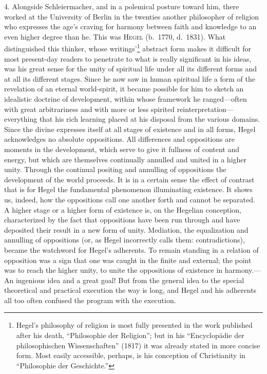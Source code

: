 \documentclass[12pt,a4paper]{book}
\newcommand{\opage}[1]{\marginnote{\footnotesize\textit{[#1]}}}
\begin{document}
4. Alongside Schleiermacher, and in a polemical posture
toward him, there worked at the University of Berlin in the twenties
another philosopher of religion who expresses the age's craving for
harmony between faith and knowledge to an even higher degree than he.
This was \textsc{Hegel} (b.\ 1770, d.\ 1831). What distinguished this
thinker, whose writings'\footnote{Hegel's philosophy of religion is
most fully presented in the work published after his death, ``Philosophie
der Religion''; but in his ``Encyclopädie der philosophischen
Wissenschaften'' (1817) it was already stated in more concise form. Most
easily accessible, perhaps, is his conception of Christianity in
``Philosophie der Geschichte.''} abstract form makes it difficult for most
present-day readers to penetrate to what is really significant in his
ideas, was his great sense for the
\opage{11}unity of spiritual life under all its different forms and at all its
different stages. Since he now saw in human spiritual life a form of the
revelation of an eternal world-spirit, it became possible for him to
sketch an idealistic doctrine of development, within whose framework he
ranged---often with great arbitrariness and with more or less spirited
reinterpretation---everything that his rich learning placed at his
disposal from the various domains. Since the divine expresses itself at
all stages of existence and in all forms, Hegel acknowledges no absolute
oppositions. All differences and oppositions are moments in the
development, which serve to give it fullness of content and energy, but
which are themselves continually annulled and united in a higher unity.
Through the continual positing and annulling of oppositions the
development of the world proceeds. It is in a certain sense the effect of
contrast that is for Hegel the fundamental phenomenon illuminating
existence. It shows us, indeed, how the oppositions call one another
forth and cannot be separated. A higher stage or a higher form of
existence is, on the Hegelian conception, characterized by the fact that
oppositions have been run through and have deposited their result in a
new form of unity. Mediation, the equalization and annulling of
oppositions (or, as Hegel incorrectly calls them: contradictions), became
the watchword for Hegel's adherents. To remain standing in a relation of
opposition was a sign that one was caught in the finite and external; the
point was to reach the higher unity, to unite the oppositions of existence
in harmony.---An ingenious idea and a great goal! But from the general
idea to the special theoretical and practical execution the way is long,
and Hegel and his adherents all too often confused the program with the
execution.
\end{document}
